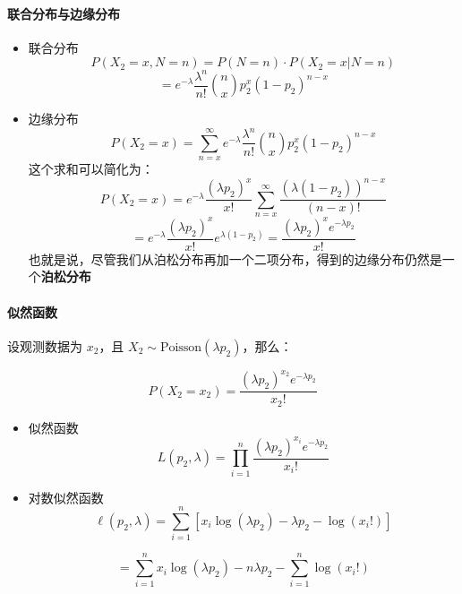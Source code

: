 \documentclass{article}
\begin{document}
\paragraph{联合分布与边缘分布}
\begin{itemize}
    \item 联合分布
    \texttt{$$P(X_2 = x, N = n) = P(N = n) \cdot P(X_2 = x | N = n)$$}
    \texttt{$$= e^{-\lambda} \frac{\lambda^n}{n!} \binom{n}{x} p_2^x (1 - p_2)^{n - x}$$}
    \item 边缘分布
    $$
    P(X_2 = x) = \sum_{n=x}^\infty e^{-\lambda} \frac{\lambda^n}{n!} \binom{n}{x} p_2^x (1 - p_2)^{n - x}
    $$
    这个求和可以简化为：
    \texttt{$$
P(X_2 = x) = e^{-\lambda} \frac{(\lambda p_2)^x}{x!} \sum_{n=x}^\infty \frac{(\lambda (1 - p_2))^{n - x}}{(n - x)!} $$}
    \texttt{$$= e^{-\lambda} \frac{(\lambda p_2)^x}{x!} e^{\lambda (1 - p_2)} = \frac{(\lambda p_2)^x e^{-\lambda p_2}}{x!}
$$}
也就是说，尽管我们从泊松分布再加一个二项分布，得到的边缘分布仍然是一个\textbf{泊松分布}
\end{itemize}
\paragraph{似然函数}
设观测数据为 $ x_2 $，且 $ X_2 \sim \text{Poisson}(\lambda p_2) $，那么：

$$
P(X_2 = x_2) = \frac{(\lambda p_2)^{x_2} e^{-\lambda p_2}}{x_2!}
$$
\begin{itemize}
    \item 似然函数
    $$L(p_2, \lambda) = \prod_{i=1}^n \frac{(\lambda p_2)^{x_i} e^{-\lambda p_2}}{x_i!}$$
    \item 对数似然函数
    $$\ell(p_2, \lambda) = \sum_{i=1}^n \left[ x_i \log(\lambda p_2) - \lambda p_2 - \log(x_i!) \right]$$

    $$= \sum_{i=1}^n x_i \log(\lambda p_2) - n \lambda p_2 - \sum_{i=1}^n \log(x_i!)$$

\end{itemize}
\end{document}

